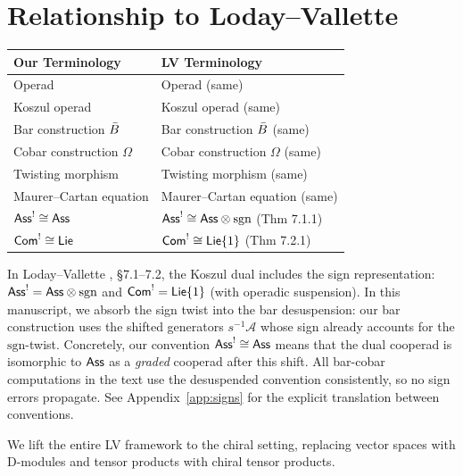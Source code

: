 \section{Relationship to Loday--Vallette}

\begin{tabular}{>{\raggedright\arraybackslash}p{}>{\raggedright\arraybackslash}p{}}
\textbf{Our Terminology} & \textbf{LV Terminology} \\
\hline
Operad & Operad (same) \\
Koszul operad & Koszul operad (same) \\
Bar construction $\bar{B}$ & Bar construction $\bar{B}$ (same) \\
Cobar construction $\Omega$ & Cobar construction $\Omega$ (same) \\
Twisting morphism & Twisting morphism (same) \\
Maurer--Cartan equation & Maurer--Cartan equation (same) \\
$\mathsf{Ass}^! \cong \mathsf{Ass}$ & $\mathsf{Ass}^! \cong \mathsf{Ass} \otimes \mathrm{sgn}$ (Thm 7.1.1) \\
$\mathsf{Com}^! \cong \mathsf{Lie}$ & $\mathsf{Com}^! \cong \mathsf{Lie}\{1\}$ (Thm 7.2.1) \\
\end{tabular}
\begin{remark}
In Loday--Vallette \cite{LV12}, \S7.1--7.2, the Koszul dual includes the sign representation: $\mathsf{Ass}^! = \mathsf{Ass} \otimes \mathrm{sgn}$ and $\mathsf{Com}^! = \mathsf{Lie}\{1\}$ (with operadic suspension). In this manuscript, we absorb the sign twist into the bar desuspension: our bar construction uses the shifted generators $s^{-1}\mathcal{A}$ whose sign already accounts for the $\mathrm{sgn}$-twist. Concretely, our convention $\mathsf{Ass}^! \cong \mathsf{Ass}$ means that the dual cooperad is isomorphic to $\mathsf{Ass}$ as a \emph{graded} cooperad after this shift. All bar-cobar computations in the text use the desuspended convention consistently, so no sign errors propagate. See Appendix~\ref{app:signs} for the explicit translation between conventions.
\end{remark}

\begin{remark}
We lift the entire LV framework to the chiral setting, replacing vector spaces with D-modules and tensor products with chiral tensor products.
\end{remark}


